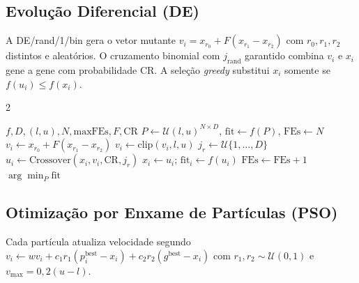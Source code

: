 \documentclass[runningheads]{llncs}
\begin{document}
\subsection{Evolução Diferencial (DE)}

A DE/rand/1/bin gera o vetor mutante $v_i = x_{r_0}+F(x_{r_1}-x_{r_2})$
com $r_0,r_1,r_2$ distintos e aleatórios. O cruzamento binomial com
$j_\text{rand}$ garantido combina $v_i$ e $x_i$ gene a gene com
probabilidade CR\@. A seleção \emph{greedy} substitui $x_i$ somente se
$f(u_i)\leq f(x_i)$.

\begin{algorithm}[H]
\caption{Evolução Diferencial (DE/rand/1/bin)}\label{alg:de}
\begin{multicols}{2}
\begin{algorithmic}[1]
\footnotesize
\Require $f,D,(l,u),N,\text{maxFEs},F,\text{CR}$
\State $P\!\leftarrow\!\mathcal{U}(l,u)^{N\times D}$,
       $\text{fit}\!\leftarrow\!f(P)$,
       $\text{FEs}\!\leftarrow\!N$
    \State $v_i\!\leftarrow\!x_{r_0}\!+\!F(x_{r_1}\!-\!x_{r_2})$
    \State $v_i\!\leftarrow\!\text{clip}(v_i,l,u)$
    \State $j_r\!\leftarrow\!\mathcal{U}\{1,\ldots,D\}$
    \State $u_i\!\leftarrow\!\text{Crossover}(x_i,v_i,\text{CR},j_r)$
      \State $x_i\!\leftarrow\!u_i$;
             $\text{fit}_i\!\leftarrow\!f(u_i)$
    \EndIf
    \State $\text{FEs}\!\leftarrow\!\text{FEs}+1$
  \EndFor
\EndWhile
\State \Return $\arg\min_P\text{fit}$
\end{algorithmic}
\end{multicols}
\end{algorithm}

\subsection{Otimização por Enxame de Partículas (PSO)}

Cada partícula atualiza velocidade segundo
$v_i \leftarrow w v_i + c_1 r_1(p_i^\text{best}-x_i)
+ c_2 r_2(g^\text{best}-x_i)$
com $r_1,r_2\sim\mathcal{U}(0,1)$ e $v_\text{max}=0{,}2(u-l)$.
\end{document}
